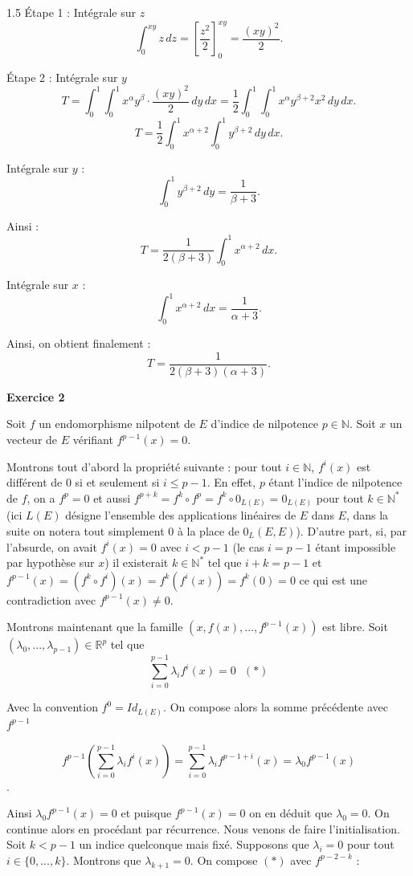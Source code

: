 \documentclass[12pt]{article}
\begin{document}
\begin{spacing}{1.5}
Étape 1 : Intégrale sur $z$
\[
\int_{0}^{xy} z \, dz = \left[ \frac{z^2}{2} \right]_{0}^{xy} = \frac{(xy)^2}{2}.
\]

Étape 2 : Intégrale sur $y$
\[
T = \int_{0}^{1} \int_{0}^{1} x^\alpha y^\beta \cdot \frac{(xy)^2}{2} \, dy \, dx = \frac{1}{2} \int_{0}^{1} \int_{0}^{1} x^\alpha y^{\beta+2} x^2 \, dy \, dx.
\]
\[
T = \frac{1}{2} \int_{0}^{1} x^{\alpha+2} \int_{0}^{1} y^{\beta+2} \, dy \, dx.
\]

Intégrale sur $y$ :
\[
\int_{0}^{1} y^{\beta+2} \, dy = \frac{1}{\beta+3}.
\]

Ainsi :
\[
T = \frac{1}{2(\beta+3)} \int_{0}^{1} x^{\alpha+2} \, dx.
\]

Intégrale sur $x$ :
\[
\int_{0}^{1} x^{\alpha+2} \, dx = \frac{1}{\alpha+3}.
\]

Ainsi, on obtient finalement :
\[
T = \frac{1}{2(\beta+3)(\alpha+3)}.
\]



\medskip\textbf{Exercice 2}

Soit $f$ un endomorphisme nilpotent de $E$ d'indice de nilpotence $p\in  \mathbb{N}$. Soit $x$ un vecteur de $E$ vérifiant $f^{p-1}(x)= 0$.
 
 Montrons tout d'abord la propriété suivante : pour tout $i\in \mathbb{N}$, $f^i(x)$ est différent de 0 si et seulement si $i\leqslant p-1$. En effet, $p$ étant l'indice de nilpotence de $f$, on a $f^p = 0$ et aussi $f^{p+k} =f^k\circ f^p = f^k\circ 0_{L(E)} = 0_{L(E)}$ pour tout $k\in \mathbb{N}^\ast$ (ici $L(E)$ désigne l'ensemble des applications linéaires de $E$ dans $E$, dans la suite on notera tout simplement 0 à la
 place de $0_L(E,E)$). D'autre part, si, par l'absurde, on avait $f^i(x) = 0$ avec $i < p-1$ (le cas
 $i = p-1$ étant impossible par hypothèse sur $x$) il existerait $k\in \mathbb{N}^\ast$ tel que $i + k = p-1$ et $f^{p-1}(x) = (f^k\circ f^i)(x) = f^k(f^i(x)) = f^k(0) = 0$ ce qui est une contradiction avec
 $f^{p-1}(x)\neq 0$.
 
 Montrons maintenant que la famille $(x,f(x),...,f^{p-1}(x))$ est libre. Soit $(\lambda_0,...,\lambda_{p-1})\in \mathbb{R}^p$ tel que
 \[\sum_{i=0}^{p-1}\lambda_if^i(x)=0 \text{  } (\ast)\]
 
 Avec la convention $f^0=Id_{L(E)}$. On compose alors la somme précédente avec $f^{p-1}$
 
 \[f^{p-1}(\sum_{i=0}^{p-1}\lambda_if^i(x))=\sum_{i=0}^{p-1}\lambda_if^{p-1+i}(x)=\lambda_0f^{p-1}(x)\].
 
  Ainsi $\lambda_0f^{p-1}(x) = 0$ et puisque $f^{p-1}(x)= 0$ on en déduit que $\lambda_0 = 0$. On continue alors en procédant par récurrence. Nous venons de faire l'initialisation. Soit $k < p-1$ un
 indice quelconque mais fixé. Supposons que $\lambda_i = 0$ pour tout $i\in \{0,...,k\}$. Montrons que $\lambda_{k+1} = 0$. On compose $(\ast)$ avec $f^{p-2-k}$ :
 

\end{spacing}
\end{document}
